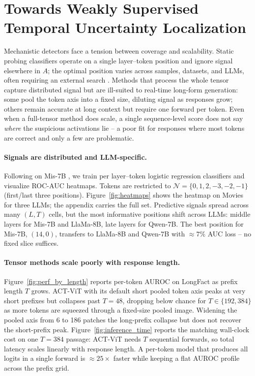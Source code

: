 \section{Towards Weakly Supervised Temporal Uncertainty Localization}
\label{sec:non_static}

Mechanistic detectors face a tension between coverage and scalability.
Static probing classifiers \citep{azaria2023,orgad2024} operate on a
single layer--token position and ignore signal elsewhere in $A$; the
optimal position varies across samples, datasets, and LLMs, often
requiring an external search \citep{orgad2024}. Methods that process
the whole tensor capture distributed signal but are ill-suited to
real-time long-form generation: some pool the token axis into a fixed
size, diluting signal as responses grow; others remain accurate at
long context but require one forward per token. Even when a
full-tensor method does scale, a single sequence-level score does not
say \emph{where} the suspicious activations lie -- a poor fit for
responses where most tokens are correct and only a few are
problematic.

\paragraph{Signals are distributed and LLM-specific.} Following
\citet{orgad2024} on Mis-7B \citep{albertqjiang2023}, we train per
layer--token logistic regression classifiers and visualize ROC-AUC
heatmaps. Tokens are restricted to
$\mathcal{N} = \{0, 1, 2, -3, -2, -1\}$ (first/last three positions).
Figure~\ref{fig:heatmaps} shows the heatmap on Movies
\citep{orgad2024} for three LLMs; the appendix carries the full set.
Predictive signals spread across many $(L, T)$ cells, but the most
informative positions shift across LLMs: middle layers for Mis-7B and
LlaMa-8B, late layers for Qwen-7B. The best position for Mis-7B,
$(14, 0)$, transfers to LlaMa-8B and Qwen-7B with $\approx 7\%$ AUC
loss -- no fixed slice suffices.



\paragraph{Tensor methods scale poorly with response length.}
Figure~\ref{fig:perf_by_length} reports per-token AUROC on LongFact as
prefix length $T$ grows. ACT-ViT with its default short pooled token
axis peaks at very short prefixes but collapses past $T = 48$,
dropping below chance for $T \in \{192, 384\}$ as more tokens are
squeezed through a fixed-size pooled image. Widening the pooled axis
from 6 to 186 patches the long-prefix collapse but does not recover
the short-prefix peak. Figure~\ref{fig:inference_time} reports the
matching wall-clock cost on one $T = 384$ passage: ACT-ViT needs $T$
sequential forwards, so total latency scales linearly with response
length. A per-token model that produces all logits in a single
forward is $\approx 25\times$ faster while keeping a flat AUROC
profile across the prefix grid.

